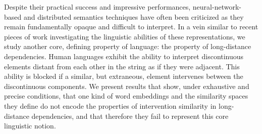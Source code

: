 Despite their practical success and impressive performances, neural-network-based and distributed semantics techniques have often been criticized as they remain fundamentally opaque and difficult to interpret. In a vein similar to recent pieces of work investigating the linguistic abilities of these representations, we study another core, defining property of language: the property of long-distance dependencies. Human languages exhibit the ability to interpret discontinuous elements distant from each other in the string as if they were adjacent. This ability is blocked if a similar, but extraneous, element intervenes between the discontinuous components. We present results that show, under exhaustive and precise conditions, that one kind of word embeddings and the similarity spaces they define do not encode the properties of intervention similarity in long-distance dependencies, and that therefore they fail to represent this core linguistic notion.
